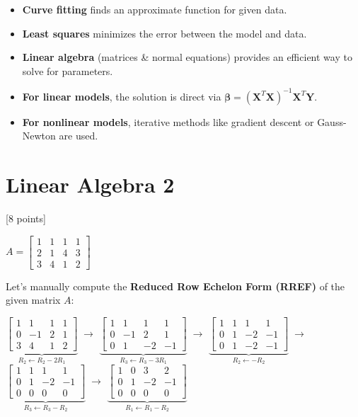 \documentclass[11pt]{article}
\providecommand{\tightlist}{%
      \setlength{\itemsep}{0pt}\setlength{\parskip}{0pt}}
\begin{document}
\begin{itemize}
\tightlist
\item
  \textbf{Curve fitting} finds an approximate function for given data.
\item
  \textbf{Least squares} minimizes the error between the model and data.
\item
  \textbf{Linear algebra} (matrices \& normal equations) provides an
  efficient way to solve for parameters.
\item
  \textbf{For linear models}, the solution is direct via
  \(\boldsymbol{\beta} = (\mathbf{X}^T \mathbf{X})^{-1} \mathbf{X}^T \mathbf{Y}\).
\item
  \textbf{For nonlinear models}, iterative methods like gradient descent
  or Gauss-Newton are used.
\end{itemize}

    \section{Linear Algebra 2}\label{linear-algebra-2}

{[}8 points{]}

    \(A = \begin{bmatrix} 1 & 1 & 1 & 1 \\ 2 & 1 & 4 & 3 \\ 3 & 4 & 1 & 2 \end{bmatrix}\)

Let's manually compute the \textbf{Reduced Row Echelon Form (RREF)} of
the given matrix \(A\):

\(\underbrace{\begin{bmatrix} 1 & 1 & 1 & 1 \\ 0 & -1 & 2 & 1 \\ 3 & 4 & 1 & 2 \end{bmatrix}}_{R_2 \leftarrow R_2 - 2R_1} \; \to\)
\(\underbrace{\begin{bmatrix} 1 & 1 & 1 & 1 \\ 0 & -1 & 2 & 1 \\ 0 & 1 & -2 & -1 \end{bmatrix}}_{R_3 \leftarrow R_3 - 3R_1} \; \to\)
\(\underbrace{\begin{bmatrix} 1 & 1 & 1 & 1 \\ 0 & 1 & -2 & -1 \\ 0 & 1 & -2 & -1 \end{bmatrix}}_{R_2 \leftarrow -R_2} \; \to\)
\(\underbrace{\begin{bmatrix} 1 & 1 & 1 & 1 \\ 0 & 1 & -2 & -1 \\ 0 & 0 & 0 & 0 \end{bmatrix}}_{R_3 \leftarrow R_3 - R_2} \; \to\)
\(\underbrace{\begin{bmatrix} 1 & 0 & 3 & 2 \\ 0 & 1 & -2 & -1 \\ 0 & 0 & 0 & 0 \end{bmatrix}}_{R_1 \leftarrow R_1 - R_2}\)
\end{document}
